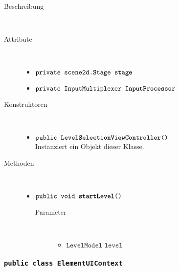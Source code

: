 \begin{description}
\item[Beschreibung] \hfill \\ 
\item[Attribute] \hfill \\
	\vspace{-.8cm}
	\begin{itemize}	
		\item $\texttt{private scene2d.Stage \textbf{stage}}$ \\ 		
		\item $\texttt{private InputMultiplexer \textbf{InputProcessor}}$ \\ 
		\end{itemize}
	
\item[Konstruktoren] \hfill \\
	\vspace{-.8cm}
	\begin{itemize}
		\item $\texttt{public \textbf{LevelSelectionViewController}()}$ \\ Instanziert ein Objekt dieser Klasse.

	\end{itemize}
	
\item[Methoden] \hfill \\
	\vspace{-.8cm}
	\begin{itemize}
		\item $\texttt{public void \textbf{startLevel}()}$ \\ 
			\begin{description}
			\item[Parameter] \hfill \\
			\vspace{-.8cm}
			\begin{itemize}
				\item $\texttt{LevelModel level}$ \\ 
			\end{itemize}
			\end{description}
			

		\end{itemize}
	\end{description}



\subsubsection{\normalfont \texttt{public class \textbf{ElementUIContext}}}

